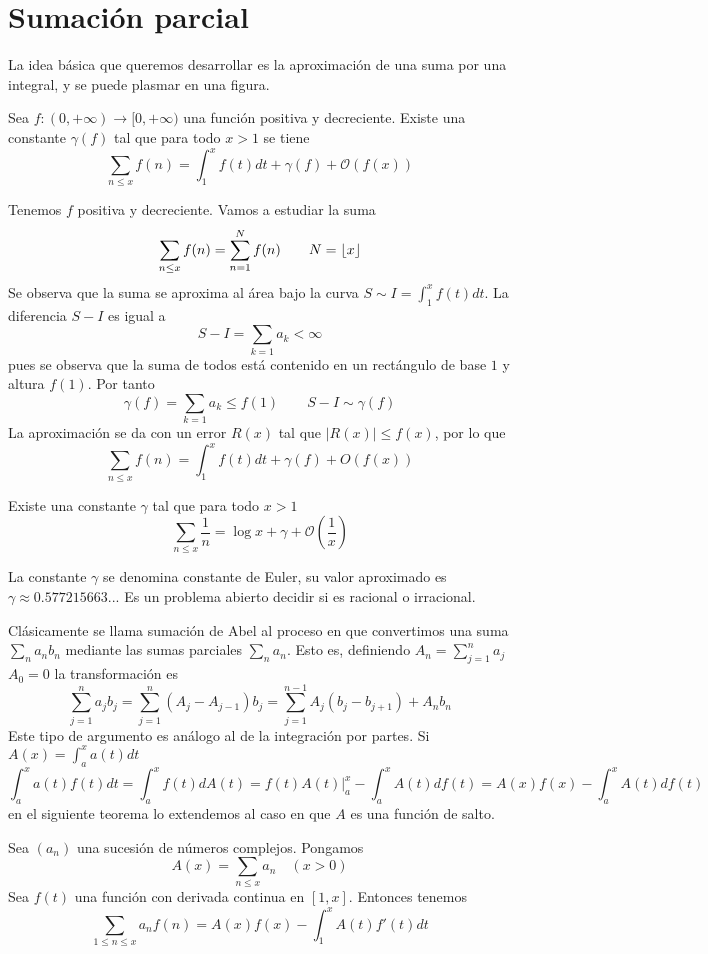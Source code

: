 \documentclass[TAN.tex]{subfiles}
\begin{document}
\section{Sumación parcial}
La idea básica que queremos desarrollar es la aproximación de una suma por una integral, y se puede plasmar en una figura.

\begin{teorema}
Sea $f : (0,+\infty) \to [0,+\infty)$ una función positiva y decreciente. Existe una constante $γ(f)$ tal que para todo $x>1$ se tiene
\[ \sum_{n≤x} f(n) = \int_1^x f(t)dt + γ(f) + \mathcal{O}(f(x)) \]
\end{teorema}
\begin{dem}
Tenemos $f$ positiva y decreciente. Vamos a estudiar la suma
$$
\sum_{n\leq x}f(n) = \sum_{n=1}^N f(n) \qquad N=\left\lfloor{x}\right\rfloor
$$
Se observa que la suma se aproxima al área bajo la curva $S\sim I = \int_1^x f(t)dt$. La diferencia $S-I$ es igual a 
$$S-I = \sum_{k=1} a_k < \infty$$ pues se observa que la suma de todos está contenido en un rectángulo de base $1$ y altura $f(1)$. Por tanto
$$
\gamma(f) = \sum_{k=1} a_k \leq f(1) \qquad S - I \sim \gamma(f) 
$$
La aproximación se da con un error $R(x)$ tal que $|R(x)|\leq f(x)$, por lo que
$$
\sum_{n\leq x} f(n) = \int_1^x f(t)dt + \gamma(f) + O(f(x))
$$
\QED
\end{dem}

\begin{teorema}
Existe una constante $γ$ tal que para todo $x>1$
\[ \sum_{n≤x} \frac{1}{n} = \log x + γ + \mathcal{O}\left(\frac{1}{x}\right) \]
\end{teorema}
La constante $γ$ se denomina constante de Euler, su valor aproximado es $γ \approx 0.577215663...$ Es un problema abierto decidir si es racional o irracional.

Clásicamente se llama sumación de Abel al proceso en que convertimos una suma $\sum_n a_n b_n$ mediante las sumas parciales $\sum_n a_n$. Esto es, definiendo $A_n = \sum_{j=1}^n a_j$ $ A_0 = 0$
la transformación es
\[ \sum_{j=1}^n a_j b_j = \sum_{j=1}^n (A_j-A_{j-1})b_j = \sum_{j=1}^{n-1} A_j(b_j-b_{j+1}) + A_n b_n \]
Este tipo de argumento es análogo al de la integración por partes. Si $A(x)=\int_a^x a(t)dt$
\[ \int_a^x a(t)f(t) dt = \int_a^x f(t) dA(t) = \left.f(t)A(t)\right|_a^x - \int_a^x A(t) df(t) = A(x)f(x) - \int_a^x A(t) df(t) \]
en el siguiente teorema lo extendemos al caso en que $A$ es una función de salto.

\begin{teorema} Sea $(a_n)$ una sucesión de números complejos. Pongamos
\[ A(x) = \sum_{n≤x} a_n \quad (x > 0) \]
Sea $f(t)$ una función con derivada continua en $[1,x]$. Entonces tenemos
\[ \sum_{1≤n≤x} a_nf(n) = A(x)f(x)-\int_1^x A(t)f'(t)dt \]
\end{teorema}
\end{document}
